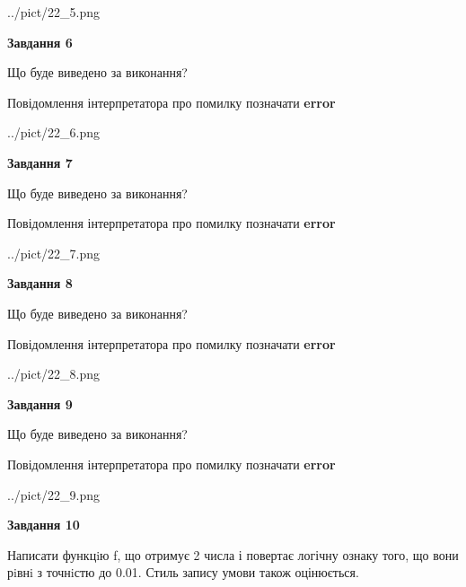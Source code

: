 \documentclass[12pt, ukrainian]{article}
\begin{document}
{\begin {large}
\begin{center}
	{../pict/22_5.png}
\end{center}
\newpage

{\begin {center}\textbf{Завдання 6}\end {center}}\par
Що буде виведено за виконання? \par
Повідомлення інтерпретатора про помилку позначати \textbf{error}

\begin{center}
	{../pict/22_6.png}
\end{center}
\newpage

{\begin {center}\textbf{Завдання 7}\end {center}}\par
Що буде виведено за виконання? \par
Повідомлення інтерпретатора про помилку позначати \textbf{error}

\begin{center}
	{../pict/22_7.png}
\end{center}
\newpage

{\begin {center}\textbf{Завдання 8}\end {center}}\par
Що буде виведено за виконання? \par
Повідомлення інтерпретатора про помилку позначати \textbf{error}

\begin{center}
	{../pict/22_8.png}
\end{center}
\newpage

{\begin {center}\textbf{Завдання 9}\end {center}}\par
Що буде виведено за виконання? \par
Повідомлення інтерпретатора про помилку позначати \textbf{error}

\begin{center}
	{../pict/22_9.png}
\end{center}
\newpage

{\begin {center}\textbf{Завдання 10}\end {center}}\par

Написати функцiю f, що отримує 2 числа і повертає логічну ознаку того, що вони рiвнi з точнiстю до 0.01. Стиль запису умови також оцінюється.\par
\newpage

\end {large}}
\end{document}

